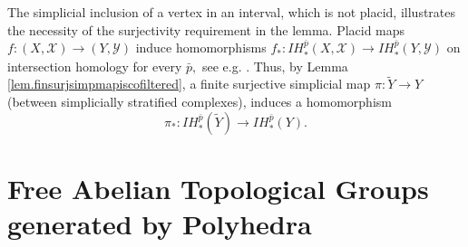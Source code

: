 \documentclass{amsart}
\theoremstyle{definition}
\theoremstyle{remark}
\newcommand {\Xa}    {\ensuremath{\mathcal{X}}}
\newcommand {\Ya}    {\ensuremath{\mathcal{Y}}}
\begin{document}
The simplicial inclusion of a vertex in an interval, which is not placid,
illustrates the necessity of the surjectivity requirement in the lemma.
Placid maps $f: (X,\Xa) \to (Y,\Ya)$ induce homomorphisms
$f_*: IH^{\bar{p}}_* (X,\Xa) \to IH^{\bar{p}}_* (Y,\Ya)$ on intersection homology
for every $\bar{p},$ see e.g. \cite[Prop. 4.1.6, p. 138]{friedmanihbook}.
Thus, by Lemma \ref{lem.finsurjsimpmapiscofiltered},
a finite surjective simplicial map $\pi: \widetilde{Y} \to Y$
(between simplicially stratified complexes),
induces a homomorphism
\[ \pi_*: IH^{\bar{p}}_* (\widetilde{Y}) \longrightarrow IH^{\bar{p}}_* (Y).  \]





\section{Free Abelian Topological Groups generated by Polyhedra}
\label{sec.freeabtopgroups}
\end{document}
